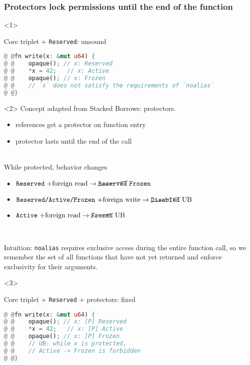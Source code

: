 \begin{frame}[fragile]
    \frametitle{Protectors lock permissions until the end of the function}
    \begin{onlyenv}<1>
        \begin{block}{Core triplet + \texttt{Reserved}: unsound}
            \begin{lstlisting}[language=rust, escapechar=@]
@ @fn write(x: &mut u64) {
@ @    opaque(); // x: Reserved
@ @    *x = 42;   // x: Active
@ @    opaque(); // x: Frozen
@ @    // `x` does not satisfy the requirements of `noalias`
@ @}
            \end{lstlisting}
        \end{block}
    \end{onlyenv}

    \begin{onlyenv}<2>
        Concept adapted from Stacked Borrows: protectors.
        \begin{itemize}
            \item references get a protector on function entry
            \item protector lasts until the end of the call
        \end{itemize}
        ~\\
        While protected, behavior changes
        \begin{itemize}
            \item \(\texttt{Reserved}~\text{+foreign read}\to \cancel{\texttt{Reserved}}~\texttt{Frozen}\)
            \item \(\texttt{Reserved/Active/Frozen}~\text{+foreign write} \to \cancel{\texttt{Disabled}}~\text{UB}\)
            \item \(\texttt{Active}~\text{+foreign read}\to \cancel{\texttt{Frozen}}~\text{UB}\)
        \end{itemize}~\\

        \begin{block}{}
            Intuition: \texttt{noalias} requires exclusive access during the entire
            function call, so we remember the set of all functions that have not yet
            returned and enforce exclusivity for their arguments.
        \end{block}
    \end{onlyenv}

    \begin{onlyenv}<3>
        \begin{block}{Core triplet + \texttt{Reserved} + protectors: fixed}
            \begin{lstlisting}[language=rust, escapechar=@]
@ @fn write(x: &mut u64) {
@ @    opaque(); // x: [P] Reserved
@ @    *x = 42;   // x: [P] Active
@ @    opaque(); // x: [P] Frozen
@ @    // UB: while x is protected,
@ @    // Active -> Frozen is forbidden
@ @}
            \end{lstlisting}
        \end{block}
    \end{onlyenv}


\end{frame}

